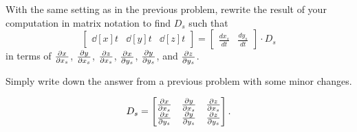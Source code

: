\documentclass{ximera}
\begin{document}
\begin{problem}
  With the same setting as in the previous problem, rewrite the result
  of your computation in matrix notation to find $D_s$
  such that
\[
\begin{bmatrix}
\dd[x]{t} & \dd[y]{t} & \dd[z]{t}
\end{bmatrix}
=
\begin{bmatrix}
\frac{dx_s}{dt} & \frac{dy_s}{dt}
\end{bmatrix}\cdot D_s
\]
in terms of $\pp[x]{x_s}$, $\pp[y]{x_s}$, $\pp[z]{x_s}$,
$\pp[x]{y_s}$, $\pp[y]{y_s}$, and $\pp[z]{y_s}$.
\begin{hint}
  Simply write down the answer from a previous problem with some minor
  changes.
\end{hint}
\begin{freeResponse}
  \[
  D_s =
  \begin{bmatrix}
    \pp[x]{x_s} & \pp[y]{x_s} & \pp[z]{x_s} \\
    \pp[x]{y_s}   & \pp[y]{y_s}   & \pp[z]{y_s}
  \end{bmatrix}.
  \]
\end{freeResponse}
\end{problem}
\end{document}
